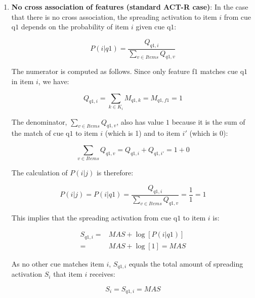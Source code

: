 \documentclass{cambridge7A}\usepackage[]{graphicx}\usepackage[]{color}
\begin{document}
\begin{enumerate}
\item
\textbf{No cross association of features (standard ACT-R case)}:
In the case that there is no  cross association, the spreading activation to item $i$ from cue q$1$ depends on the probability of item $i$ given cue q$1$:

\begin{equation} \label{eq:newfannoxassoc2}
	P(i|q1) = \frac{Q_{q1,i}}{\sum\limits_{v\in Items} Q_{q1,v}}
\end{equation}

The numerator is computed as follows. Since only feature f$1$ matches cue q$1$ in item $i$, we have:

\begin{equation}
Q_{q1,i} = \sum_{k \in K_i} M_{q1,k} = M_{q1,f1} = 1
\end{equation}

The denominator, $\sum\limits_{v \in Items} Q_{q1,v}$, also has value $1$ because it is the sum of the match of cue q$1$ to item $i$ (which is 1) and to item $i'$ (which is 0):

\begin{equation}
\sum_{v\in Items} Q_{q1,v} = Q_{q1,i} + Q_{q1,i'} = 1 + 0 
\end{equation}

The  calculation of $P(i|j)$ is therefore:

\begin{equation}
P(i|j) =  P(i|q1) = \frac{Q_{q1,i}}{\sum\limits_{v \in Items} Q_{q1,v}} = \frac{1}{1} = 1 
\end{equation}

This implies that the spreading activation from cue q$1$ to item $i$ is:

\begin{equation}
\begin{split} 
	S_{q1,i} =& \textit{MAS} + \log [P(i|q1)] \\
	         =& \textit{MAS} + \log [1] = \textit{MAS}
\end{split}
\end{equation}

As no other cue matches item $i$, $S_{q1,i}$ equals the total amount of spreading activation $S_i$ that item $i$ receives: 

\begin{equation}
	S_{i} = S_{q1,i} = \textit{MAS} 
\end{equation}


\end{enumerate}
\end{document}
